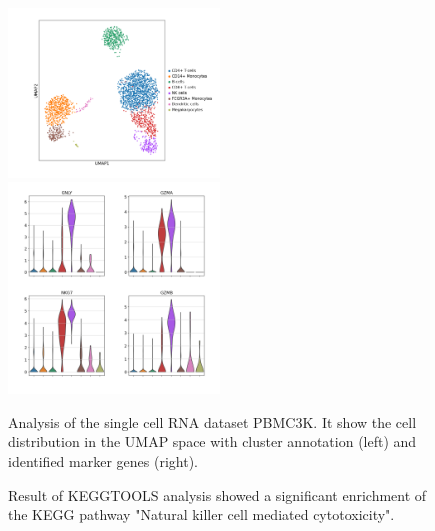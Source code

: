 \documentclass[11pt,a4paper]{article}
\begin{document}
\begin{figure}

    \includegraphics[width=0.5\textwidth, valign=t]{figure2.png}
    \includegraphics[width=0.5\textwidth, valign=t]{figure3.png}

    \caption{Analysis of the single cell RNA dataset PBMC3K. It show the cell distribution in the UMAP space with
    cluster annotation (left) and identified marker genes (right).
    }
\end{figure}



\begin{figure}

    \caption{Result of KEGGTOOLS analysis showed a significant enrichment of the KEGG pathway "Natural killer cell
    mediated cytotoxicity".}
\end{figure}
\end{document}
